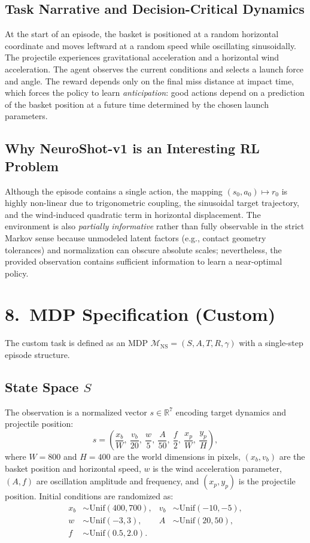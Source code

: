 \documentclass[a4paper,11pt,notitlepage]{report}
\begin{document}
\subsection{Task Narrative and Decision-Critical Dynamics}
At the start of an episode, the basket is positioned at a random horizontal coordinate and moves leftward at a random speed while oscillating sinusoidally. The projectile experiences gravitational acceleration and a horizontal wind acceleration. The agent observes the current conditions and selects a launch force and angle. The reward depends only on the final miss distance at impact time, which forces the policy to learn \emph{anticipation}: good actions depend on a prediction of the basket position at a future time determined by the chosen launch parameters.

\subsection{Why NeuroShot-v1 is an Interesting RL Problem}
Although the episode contains a single action, the mapping $(s_0,a_0)\mapsto r_0$ is highly non-linear due to trigonometric coupling, the sinusoidal target trajectory, and the wind-induced quadratic term in horizontal displacement. The environment is also \emph{partially informative} rather than fully observable in the strict Markov sense because unmodeled latent factors (e.g., contact geometry tolerances) and normalization can obscure absolute scales; nevertheless, the provided observation contains sufficient information to learn a near-optimal policy.

\section{8.\ MDP Specification (Custom)}
The custom task is defined as an MDP $\mathcal{M}_{\mathrm{NS}}=(S,A,T,R,\gamma)$ with a single-step episode structure.

\subsection{State Space \texorpdfstring{$S$}{S}}
The observation is a normalized vector $s\in\mathbb{R}^7$ encoding target dynamics and projectile position:
\[
s=\left(\frac{x_b}{W},\ \frac{v_b}{20},\ \frac{w}{5},\ \frac{A}{50},\ \frac{f}{2},\ \frac{x_p}{W},\ \frac{y_p}{H}\right),
\]
where $W=800$ and $H=400$ are the world dimensions in pixels, $(x_b,v_b)$ are the basket position and horizontal speed, $w$ is the wind acceleration parameter, $(A,f)$ are oscillation amplitude and frequency, and $(x_p,y_p)$ is the projectile position. Initial conditions are randomized as:
\[
\begin{aligned}
x_b &\sim \mathrm{Unif}(400,700), & v_b &\sim \mathrm{Unif}(-10,-5),\\
w &\sim \mathrm{Unif}(-3,3), & A &\sim \mathrm{Unif}(20,50),\\
f &\sim \mathrm{Unif}(0.5,2.0).
\end{aligned}
\]
\end{document}
